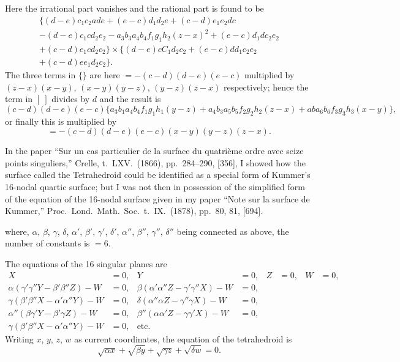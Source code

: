 \documentclass[11pt,a4paper]{book}
\begin{document}
\clearpage
Here the irrational part vanishes and the rational part is found to be
\begin{multline*}
\{(d - e)c_1c_2ade + (e - c)d_1d_2e + (c - d)e_1e_2dc \\
- (d - e)c_1cd_2e_2 - a_3b_3a_4b_4f_1g_1h_2(z - x)^2 + (e - c)d_1dc_2e_2 \\
+ (c - d)e_1cd_2c_2\} \times \{(d - e)cC_1d_2c_2 + (e - c)dd_1c_2e_2 \\
+ (c - d)ee_1d_2c_2\}.
\end{multline*}
The three terms in $\{\}$ are here $= -(c - d)(d - e)(e - c)$ multiplied by $(z - x)(x - y)$, $(x - y)(y - z)$, $(y - z)(z - x)$ respectively; hence the term in $[\ ]$ divides by $d$ and the result is
\[
(c - d)(d - e)(e - c)\{a_3b_1a_4b_4f_1g_1h_1(y - z) + a_4b_3a_5b_5f_2g_2h_2(z - x) + aba_6b_6f_3g_3h_3(x - y)\},
\]
or finally this is multiplied by
\[
= -(c - d)(d - e)(e - c)(x - y)(y - z)(z - x).
\]

\clearpage

In the paper ``Sur un cas particulier de la surface du quatri\`eme ordre avec seize points singuliers,'' Crelle, t.\ LXV.\ (1866), pp.\ 284--290, [356], I showed how the surface called the Tetrahedroid could be identified as a special form of Kummer's 16-nodal quartic surface; but I was not then in possession of the simplified form of the equation of the 16-nodal surface given in my paper ``Note sur la surface de Kummer,'' Proc.\ Lond.\ Math.\ Soc.\ t.\ IX.\ (1878), pp.\ 80, 81, [694].

\clearpage
where, $\alpha$, $\beta$, $\gamma$, $\delta$, $\alpha'$, $\beta'$, $\gamma'$, $\delta'$, $\alpha''$, $\beta''$, $\gamma''$, $\delta''$ being connected as above, the number of constants is $= 6$.

The equations of the 16 singular planes are
\begin{align*}
X &= 0, & Y &= 0, & Z &= 0, & W &= 0, \\
\alpha(\gamma'\gamma''Y - \beta'\beta''Z) - W &= 0, & \beta(\alpha'\alpha''Z - \gamma'\gamma''X) - W &= 0, \\
\gamma(\beta'\beta''X - \alpha'\alpha''Y) - W &= 0, & \delta(\alpha''\alpha Z - \gamma''\gamma X) - W &= 0, \\
\alpha''(\beta\gamma'Y - \beta'\gamma Z) - W &= 0, & \beta''(\alpha\alpha'Z - \gamma\gamma'X) - W &= 0, \\
\gamma(\beta'\beta''X - \alpha'\alpha''Y) - W &= 0, & \text{etc.}
\end{align*}
Writing $x$, $y$, $z$, $w$ as current coordinates, the equation of the tetrahedroid is
\[
\sqrt{\alpha x} + \sqrt{\beta y} + \sqrt{\gamma z} + \sqrt{\delta w} = 0.
\]
\end{document}
